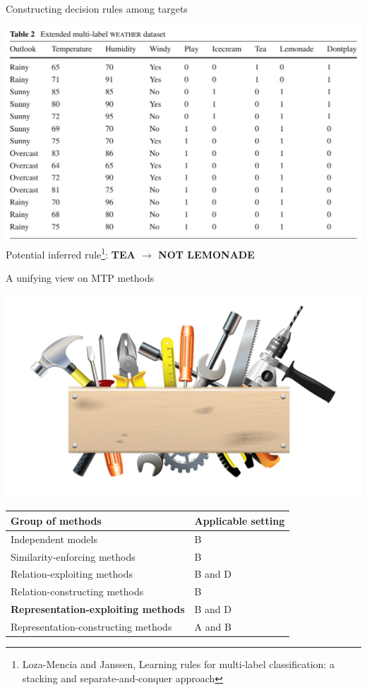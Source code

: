 \documentclass[]{beamer}
\renewcommand{\alert}[1]{\textbf{\color{putblue} #1}}
\begin{document}
\begin{frame}{Constructing decision rules among targets}
\begin{center}
\includegraphics[scale=0.3]{Figures/rules} \\ 
Potential inferred rule\footnote{Loza-Mencia and Janssen, Learning rules for multi-label classification: a stacking and separate-and-conquer approach}: \alert{TEA $\rightarrow$ NOT LEMONADE} \\

\vspace{0.3cm}
\end{center}

\end{frame}


\begin{frame}{A unifying view on MTP methods}

\begin{center}
\includegraphics[scale=0.3]{pics/tools}

\begin{tabular}{ll}
\hline
Group of methods & Applicable setting \\
\hline
\hline
Independent models & B \\
Similarity-enforcing methods & B   \\ 
Relation-exploiting methods & B and D  \\
Relation-constructing methods & B \\
\alert{Representation-exploiting methods} & B and D \\
Representation-constructing methods & A and B \\
\hline  
\end{tabular}
\end{center}
\end{frame}
\end{document}

